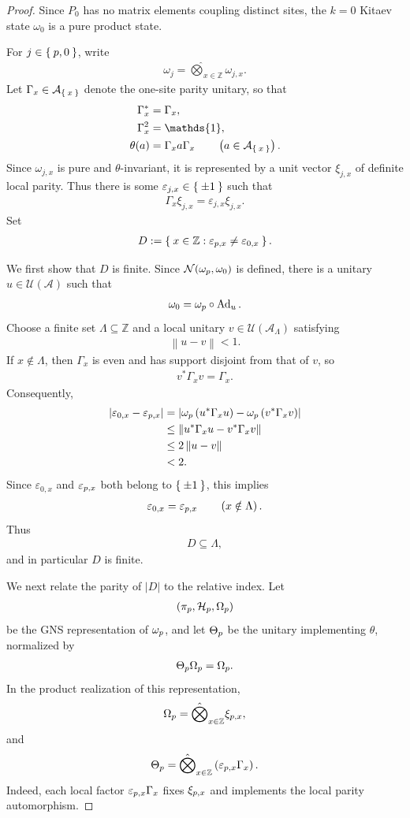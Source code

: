 \documentclass[10pt,a4paper]{amsart}
\newcommand{\Ad}[1]{\operatorname{Ad}_{#1}}
\newcommand{\Id}{\mathds{1}}
\newcommand{\ZZ}{\mathbb{Z}}
\newcommand{\br}[1]{\left(#1\right)}
\newcommand{\calA}{\mathcal{A}}
\newcommand{\calH}{\mathcal{H}}
\newcommand{\calN}{\mathcal{N}}
\newcommand{\calU}{\mathcal{U}}
\newcommand{\eq}[1]{\begin{align*}#1\end{align*}}
\newcommand\norm[1]{\left\lVert#1\right\rVert}
\newcommand{\ve}{\varepsilon}
\begin{document}
\begin{proof}
Since $P_0$ has no matrix elements coupling distinct sites, the $k=0$
Kitaev state $\omega_0$ is a pure product state.

For $j\in\Set{{\rm p},0}$, write
\eq{
\omega_j
=
\hat{\bigotimes}_{x\in\ZZ}
\omega_{j,x}.
}
Let $\Gamma_x\in\calA_{\Set{x}}$ denote the one-site parity unitary, so
that
\eq{
\Gamma_x^\ast
&=
\Gamma_x,\\
\Gamma_x^2
&=
\Id,\\
\theta(a)
&=
\Gamma_xa\Gamma_x
\qquad
\br{
a\in\calA_{\Set{x}}
}.
}
Since $\omega_{j,x}$ is pure and $\theta$-invariant, it is represented by
a unit vector $\xi_{j,x}$ of definite local parity. Thus there is some
$\ve_{j,x}\in\Set{\pm1}$ such that
\eq{
\Gamma_x\xi_{j,x}
=
\ve_{j,x}\xi_{j,x}.
}
Set
\eq{
D
:=
\Set{
x\in\ZZ:
\ve_{{\rm p},x}\neq\ve_{0,x}
}.
}

We first show that $D$ is finite. Since
$\calN(\omega_{\rm p},\omega_0)$ is defined, there is a unitary
$u\in\calU(\calA)$ such that
\eq{
\omega_0
=
\omega_{\rm p}\circ\Ad{u}.
}
Choose a finite set $\Lambda\subseteq\ZZ$ and a local unitary
$v\in\calU(\calA_\Lambda)$ satisfying
\eq{
\norm{u-v}
<
1.
}
If $x\notin\Lambda$, then $\Gamma_x$ is even and has support disjoint
from that of $v$, so
\eq{
v^\ast\Gamma_xv
=
\Gamma_x.
}
Consequently,
\eq{
\left|
\ve_{0,x}-\ve_{{\rm p},x}
\right|
&=
\left|
\omega_{\rm p}
\br{
u^\ast\Gamma_xu
}
-
\omega_{\rm p}
\br{
v^\ast\Gamma_xv
}
\right|\\
&\leq
\norm{
u^\ast\Gamma_xu
-
v^\ast\Gamma_xv
}\\
&\leq
2\norm{u-v}\\
&<
2.
}
Since $\ve_{0,x}$ and $\ve_{{\rm p},x}$ both belong to $\Set{\pm1}$, this
implies
\eq{
\ve_{0,x}
=
\ve_{{\rm p},x}
\qquad
\br{
x\notin\Lambda
}.
}
Thus
\eq{
D
\subseteq
\Lambda,
}
and in particular $D$ is finite.

We next relate the parity of $\lvert D\rvert$ to the relative index.
Let
\eq{
\br{
\pi_{\rm p},
\calH_{\rm p},
\Omega_{\rm p}
}
}
be the GNS representation of $\omega_{\rm p}$, and let
$\Theta_{\rm p}$ be the unitary implementing $\theta$, normalized by
\eq{
\Theta_{\rm p}\Omega_{\rm p}
=
\Omega_{\rm p}.
}
In the product realization of this representation,
\eq{
\Omega_{\rm p}
=
\hat{\bigotimes}_{x\in\ZZ}
\xi_{{\rm p},x},
}
and
\eq{
\Theta_{\rm p}
=
\hat{\bigotimes}_{x\in\ZZ}
\br{
\ve_{{\rm p},x}\Gamma_x
}.
}
Indeed, each local factor $\ve_{{\rm p},x}\Gamma_x$ fixes
$\xi_{{\rm p},x}$ and implements the local parity automorphism.


\end{proof}
\end{document}
